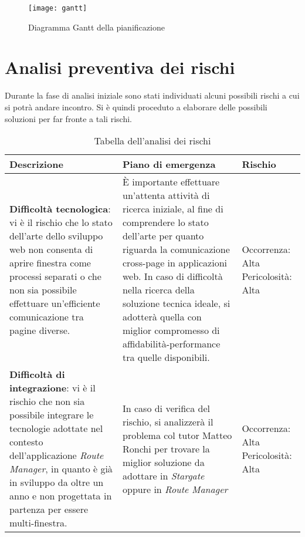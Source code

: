 \begin{figure}[H] 
    \centering 
    \texttt{[image: gantt]} 
    \caption{Diagramma Gantt della pianificazione}
\end{figure}

\section{Analisi preventiva dei rischi}

Durante la fase di analisi iniziale sono stati individuati alcuni possibili rischi a cui si potrà andare incontro.
Si è quindi proceduto a elaborare delle possibili soluzioni per far fronte a tali rischi.\\

\begin{table}[H]
\small
\begin{tabular}{ |p{4.5cm} |p{4.5cm} |p{3cm}|}
\hline
\textbf{Descrizione} & \textbf{Piano di emergenza} & \textbf{Rischio} \\ \hline
\textbf{Difficoltà tecnologica}: vi è il rischio che lo stato dell'arte dello sviluppo web non consenta di aprire finestra come processi separati o che non sia possibile effettuare un'efficiente comunicazione tra pagine diverse. & È importante effettuare un'attenta attività di ricerca iniziale, al fine di comprendere lo stato dell'arte per quanto riguarda la comunicazione cross-page in applicazioni web. \newline In caso di difficoltà nella ricerca della soluzione tecnica ideale, si adotterà quella con miglior compromesso di affidabilità-performance tra quelle disponibili. & Occorrenza: Alta \newline Pericolosità: Alta \\ \hline

\textbf{Difficoltà di integrazione}: vi è il rischio che non sia possibile integrare le tecnologie adottate nel contesto dell'applicazione \textit{Route Manager}, in quanto è già in sviluppo da oltre un anno e non progettata in partenza per essere multi-finestra. & In caso di verifica del rischio, si analizzerà il problema col tutor Matteo Ronchi per trovare la miglior soluzione da adottare in \textit{Stargate} oppure in \textit{Route Manager} & Occorrenza: Alta \newline Pericolosità: Alta \\ \hline
\end{tabular}
\caption{Tabella dell'analisi dei rischi}
\end{table}

